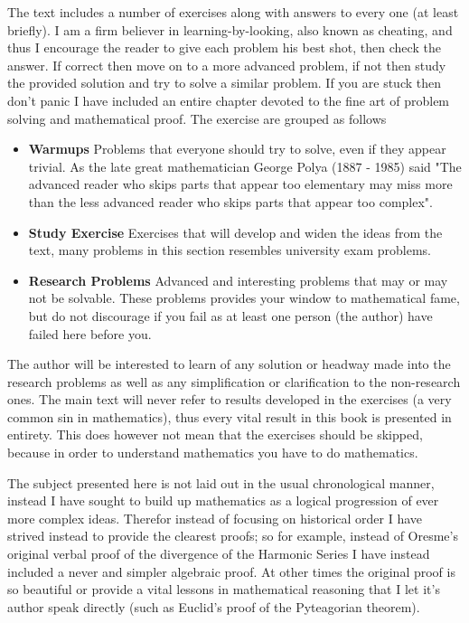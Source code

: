 The text includes a number of exercises along with answers to every one (at least briefly). I am a firm believer in
learning-by-looking, also known as cheating, and thus I encourage the reader to give each problem his best shot, then check the
answer. If correct then move on to a more advanced problem, if not then study the provided solution and try to solve a similar
problem. If you are stuck then don't panic I have included an entire chapter devoted to the fine art of problem solving and
mathematical proof. The exercise are grouped as follows
\begin{itemize}
\item \textbf{Warmups} Problems that everyone should try to solve, even if they appear trivial. As the late great mathematician
George Polya (1887 - 1985) said  "The advanced reader who skips parts that appear too elementary may miss more than the less
advanced reader who skips parts that appear too complex". 
\item \textbf{Study Exercise} Exercises that will develop and widen the ideas from the text, many problems in this section
resembles university exam problems.
\item \textbf{Research Problems} Advanced and interesting problems that may or may not be solvable. These problems provides your
window to mathematical fame, but do not discourage if you fail as at least one person (the author) have failed here before you. 
\end{itemize}
The author will be interested to learn of any solution or headway made into the research problems as well as any simplification or clarification to the non-research ones. The main text will never refer to results developed in the exercises (a very common sin in mathematics), thus every vital result in this book is presented in entirety. This does however not mean that the exercises should be skipped, because in order to understand mathematics you have to do mathematics.

The subject presented here is not laid out in the usual chronological manner, instead I have sought to build up mathematics as a
logical progression of ever more complex ideas. Therefor instead of focusing on historical order I have strived instead to provide
the clearest proofs; so for example, instead of Oresme's original verbal proof of the divergence of the Harmonic Series I have
instead included a never and simpler algebraic proof. At other times the original proof is so beautiful or provide a vital lessons
in mathematical reasoning that I let it's author speak directly (such as Euclid's proof of the Pyteagorian theorem).

